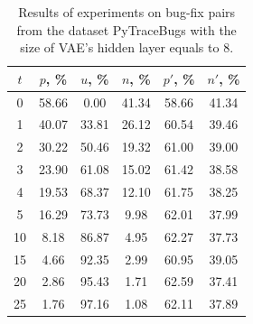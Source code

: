 \documentclass[10pt,conference]{IEEEtran}
\begin{document}

\begin{table}[]
\caption{Results of experiments on bug-fix pairs from the dataset PyTraceBugs with the size of VAE's hidden layer equals to $8$.}\label{pytracebugs8}
\begin{tabular}{|c||c|c|c||c|c|}
\hline
$t$       & $p$, \%& $u$, \% & $n$, \%  & $p'$, \%& $n'$, \% \\ \hline
0         & 58.66  & 0.00  & 41.34  & 58.66 & 41.34 \\ \hline
1         & 40.07  & 33.81 & 26.12  & 60.54 & 39.46 \\ \hline
2         & 30.22  & 50.46 & 19.32  & 61.00 & 39.00 \\ \hline
3         & 23.90  & 61.08 & 15.02  & 61.42 & 38.58 \\ \hline
4         & 19.53  & 68.37 & 12.10  & 61.75 & 38.25 \\ \hline
5         & 16.29  & 73.73 & 9.98   & 62.01 & 37.99 \\ \hline
10        & 8.18   & 86.87 & 4.95   & 62.27 & 37.73 \\ \hline
15        & 4.66   & 92.35 & 2.99   & 60.95 & 39.05 \\ \hline
20        & 2.86   & 95.43 & 1.71   & 62.59 & 37.41 \\ \hline
25        & 1.76   & 97.16 & 1.08   & 62.11 & 37.89 \\ \hline
\end{tabular}
\end{table}
\end{document}
